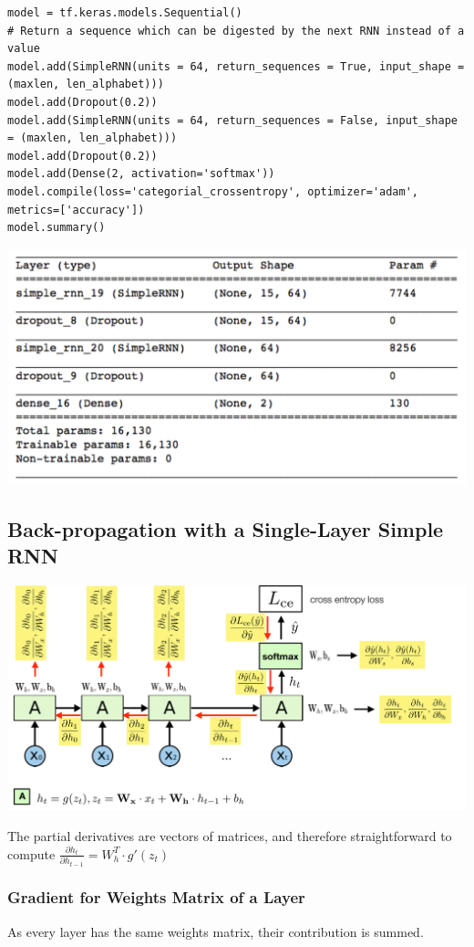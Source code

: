 \documentclass[11pt]{article}
\begin{document}
\begin{verbatim}
model = tf.keras.models.Sequential()
# Return a sequence which can be digested by the next RNN instead of a value
model.add(SimpleRNN(units = 64, return_sequences = True, input_shape = (maxlen, len_alphabet)))
model.add(Dropout(0.2))
model.add(SimpleRNN(units = 64, return_sequences = False, input_shape = (maxlen, len_alphabet)))
model.add(Dropout(0.2))
model.add(Dense(2, activation='softmax'))
model.compile(loss='categorial_crossentropy', optimizer='adam', metrics=['accuracy'])
model.summary()
\end{verbatim}

\begin{center}
	\includegraphics[width=0.6\linewidth]{img/stacked_rnn_summary}
\end{center}

\subsection{Back-propagation with a Single-Layer Simple RNN}
\begin{center}
	\includegraphics[width=0.8\linewidth]{img/simple_rnn_backprop}
\end{center}
\noindent
The partial derivatives are vectors of matrices, and therefore straightforward to compute $\frac{\partial h_t}{\partial h_{t-1}} = W_h^T\cdot g'(z_t)$

\subsubsection{Gradient for Weights Matrix of a Layer}
As every layer has the same weights matrix, their contribution is summed.
\end{document}
